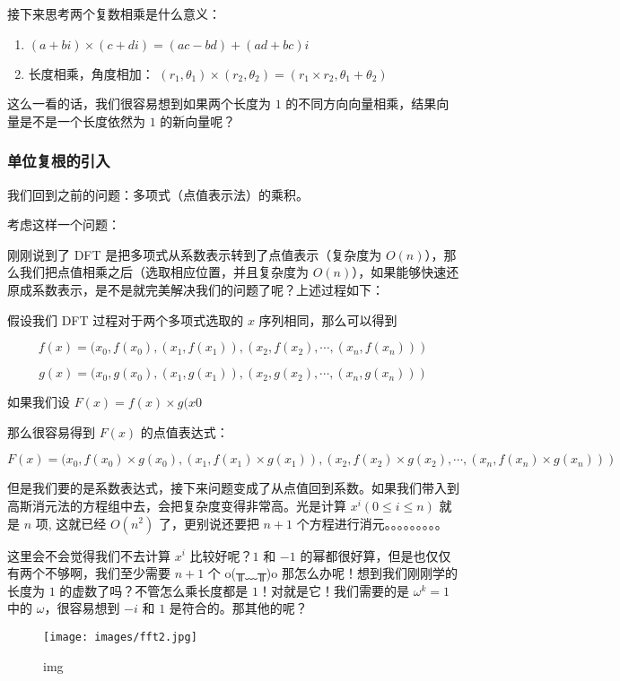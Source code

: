 接下来思考两个复数相乘是什么意义：

\begin{enumerate}
\item $(a+bi) \times (c+di) = (ac-bd) + (ad+bc)i$
\item 长度相乘，角度相加： $(r_1, \theta_1)  \times  (r_2, \theta_2) = (r_1 \times r_2, \theta_1+\theta_2)$
\end{enumerate}

这么一看的话，我们很容易想到如果两个长度为 $1$ 的不同方向向量相乘，结果向量是不是一个长度依然为 $1$ 的新向量呢？

\subsubsection{单位复根的引入}

我们回到之前的问题：多项式（点值表示法）的乘积。

考虑这样一个问题：

刚刚说到了 DFT 是把多项式从系数表示转到了点值表示（复杂度为 $O(n)$），那么我们把点值相乘之后（选取相应位置，并且复杂度为 $O(n)$），如果能够快速还原成系数表示，是不是就完美解决我们的问题了呢？上述过程如下：

假设我们 DFT 过程对于两个多项式选取的 $x$ 序列相同，那么可以得到

$$
f(x)={(x_0, f(x_0), (x_1, f(x_1)), (x_2, f(x_2), \cdots, (x_n, f(x_n)))}
$$

$$
g(x)={(x_0, g(x_0), (x_1, g(x_1)), (x_2, g(x_2), \cdots, (x_n, g(x_n)))}
$$

如果我们设 $F(x) = f(x) \times g(x0$

那么很容易得到 $F(x)$ 的点值表达式：

$$
F(x) = {(x_0, f(x_0)  \times  g(x_0), (x_1, f(x_1)  \times  g(x_1)), (x_2, f(x_2)  \times  g(x_2), \cdots, (x_n, f(x_n)  \times  g(x_n)))}
$$

但是我们要的是系数表达式，接下来问题变成了从点值回到系数。如果我们带入到高斯消元法的方程组中去，会把复杂度变得非常高。光是计算 $x^i(0 \leq i \leq n)$ 就是 $n$ 项, 这就已经 $O(n^2)$ 了，更别说还要把 $n+1$ 个方程进行消元。。。。。。。。。

这里会不会觉得我们不去计算 $x^i$ 比较好呢？$1$ 和 $-1$ 的幂都很好算，但是也仅仅有两个不够啊，我们至少需要 $n+1$ 个 o(╥﹏╥)o 那怎么办呢！想到我们刚刚学的长度为 $1$ 的虚数了吗？不管怎么乘长度都是 $1$！对就是它！我们需要的是 $\omega^k=1$ 中的 $\omega$，很容易想到 $-i$ 和 $1$ 是符合的。那其他的呢？

\begin{figure}[h]
\centering
\texttt{[image: images/fft2.jpg]} 
\caption{img}
\end{figure}


